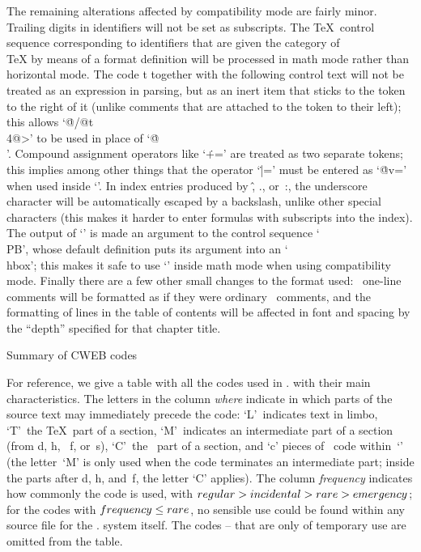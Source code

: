 The remaining alterations affected by compatibility mode are fairly minor.
Trailing digits in identifiers will not be set as subscripts. The \TeX\
control sequence corresponding to identifiers that are given the category of
\\{\TeX} by means of a format definition will be processed in math mode
rather than horizontal mode. The code \:t together with the following
control text will not be treated as an expression in parsing, but as an
inert item that sticks to the token to the right of it (unlike comments that
are attached to the token to their left); this allows `\.{@/@t\\4@>}' to be
used in place of `\.{@\\}'. Compound assignment operators like `\.{+=}' are
treated as two separate tokens; this implies among other things that the
operator `\.{|=}' must be entered as `\.{@v=}' when used inside `\pb'. In
index entries produced by \:\^, \:., or~\::, the underscore character will
be automatically escaped by a backslash, unlike other special characters
(this makes it harder to enter formulas with subscripts into the index).
The output of `\pb' is made an argument to the control sequence `\.{\\PB}',
whose default definition puts its argument into an `\.{\\hbox}'; this makes
it safe to use `\pb' inside math mode when using compatibility mode.
Finally there are a few other small changes to the format used: \Cpp\
one-line comments will be formatted as if they were ordinary \Cee~comments,
and the formatting of lines in the table of contents will be affected in
font and spacing by the ``depth'' specified for that chapter title.


\beginsection Summary of\/ {\tentt CWEB} codes

For reference, we give a table with all the codes used in \CWEB. with their
main characteristics. The letters in the column {\it where\/} indicate in
which parts of the source text may immediately precede the code:
`L'~indicates text in limbo, `T'~the \TeX~part of a section, `M'~indicates
an intermediate part of a section (from \:d, \:h, ~\:f, or~\:s), `C'~the
\Cee~part of a section, and `c' pieces of \Cee~code within~`\pb' (the
letter~`M' is only used when the code terminates an intermediate part;
inside the parts after \:d, \:h, and~\:f, the letter `C' applies). The
column {\it frequency\/} indicates how commonly the code is used, with
$\\{regular} > \\{incidental} > \\{rare} > \\{emergency}$; for the codes with
$\\{frequency}\leq\\{rare}$, no sensible use could be found within any
source file for the \CWEB. system itself. The codes \:0--\:3 that are only
of temporary use are omitted from the table.

